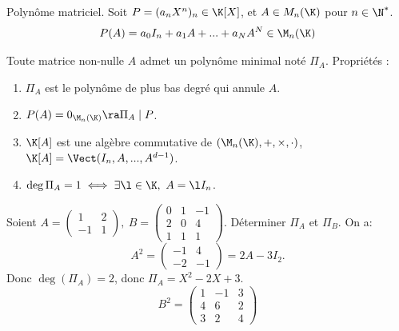\documentclass[11pt]{article}
\begin{document}
\begin{defi}{Polynôme matriciel.}{}
    Soit $P=(a_nX^n)_n\in\K[X]$, et $A\in M_n(\K)$ pour $n\in\N^*$.
    \begin{equation*}
        P(A)=a_0 I_n + a_1 A + ... + a_NA^N \in \M_n(\K)
    \end{equation*}
\end{defi}

\begin{prop}{}{}
    Toute matrice non-nulle $A$ admet un polynôme minimal noté $\Pi_A$.
    \tcblower
    Propriétés :
    \begin{enumerate}
        \item $\Pi_A$ est le polynôme de plus bas degré qui annule $A$.
        \item $P(A)=0_{\M_n(\K)}\ra \Pi_A \mid P$.
        \item $\K[A]$ est une algèbre commutative de $(\M_n(\K),+,\times,\cdot)$, $\K[A]=\Vect(I_n,A,...,A^{d-1})$.
        \item $\deg \Pi_A = 1 \iff \exists \l \in \K, ~ A = \l I_n$.
    \end{enumerate}
\end{prop}

\begin{ex}{}{}
    Soient $A=\begin{pmatrix}1&2\\-1&1\end{pmatrix}, ~ B=\begin{pmatrix}0&1&-1\\2&0&4\\1&1&1\end{pmatrix}$. Déterminer $\Pi_A$ et $\Pi_B$.
    \tcblower
    On a:
    \begin{equation*}
        A^2=\begin{pmatrix}
            -1 & 4 \\ -2 & -1
        \end{pmatrix}=2A - 3I_2.
    \end{equation*}
    Donc $\deg(\Pi_A)=2$, donc $\Pi_A=X^2-2X+3$.
    \begin{equation*}
        B^2 = \begin{pmatrix}
           1 & -1 & 3 \\ 4 & 6 & 2 \\ 3 & 2 & 4
        \end{pmatrix}
    \end{equation*}
\end{ex}\vspace*{-0.4cm}
\end{document}
